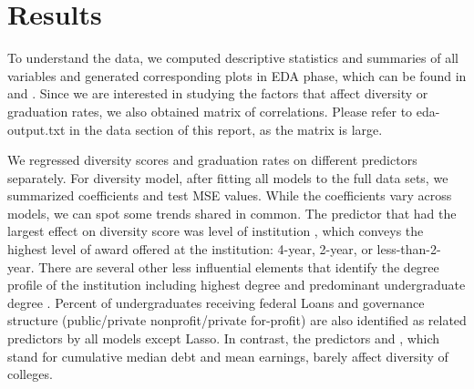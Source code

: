 \section{Results}

To understand the data, we computed descriptive statistics and summaries of all variables and generated corresponding plots in EDA phase, which can be found in  and . Since we are interested in studying the factors that affect diversity or graduation rates, we also obtained matrix of correlations. Please refer to eda-output.txt in the data section of this report, as the matrix is large. 

We regressed diversity scores and graduation rates on different predictors separately. For diversity model, after fitting all models to the full data sets, we summarized coefficients and test MSE values. While the coefficients vary across models, we can spot some trends shared in common. The predictor that had the largest effect on diversity score was level of institution , which conveys the highest level of award offered at the institution: 4-year, 2-year, or less-than-2-year. There are several other less influential elements that identify the degree profile of the institution including highest degree  and predominant undergraduate degree . Percent of undergraduates receiving federal Loans  and governance structure  (public/private nonprofit/private for-profit) are also identified as related predictors by all models except Lasso. In contrast, the predictors  and , which stand for cumulative median debt and mean earnings, barely affect diversity of colleges.

